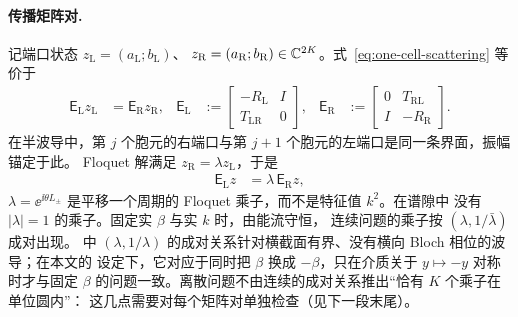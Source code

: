 \paragraph{传播矩阵对.}
记端口状态 $z_{\mathrm L}=(a_{\mathrm L};b_{\mathrm L})$、
$z_{\mathrm R}=(a_{\mathrm R};b_{\mathrm R})\in\mathbb{C}^{2K}$。式~\eqref{eq:one-cell-scattering}
等价于
\begin{align}
  \mathsf E_{\mathrm L}z_{\mathrm L}&=\mathsf E_{\mathrm R}z_{\mathrm R},
  &\mathsf E_{\mathrm L}
  &:=\begin{bmatrix}-R_{\mathrm L}&I\\ T_{\mathrm{LR}}&0\end{bmatrix},
  &\mathsf E_{\mathrm R}
  &:=\begin{bmatrix}0&T_{\mathrm{RL}}\\ I&-R_{\mathrm R}\end{bmatrix}.
  \label{eq:one-cell-pencil}
\end{align}
在半波导中，第 $j$ 个胞元的右端口与第 $j+1$ 个胞元的左端口是同一条界面，振幅锚定于此。
Floquet 解满足 $z_{\mathrm R}=\lambda z_{\mathrm L}$，于是
\begin{align}
  \mathsf E_{\mathrm L}z&=\lambda\,\mathsf E_{\mathrm R}z,
  \label{eq:one-cell-gep}
\end{align}
$\lambda=\ee^{\ii\theta L_\pm}$ 是平移一个周期的 Floquet 乘子，而不是特征值 $k^2$。在谱隙中
没有 $|\lambda|=1$ 的乘子。固定实 $\beta$ 与实 $k$ 时，由能流守恒，
连续问题的乘子按 $(\lambda,1/\bar\lambda)$ 成对出现。\cite[定理~5.1, 6.1]{JolyLiFliss2006}
中 $(\lambda,1/\lambda)$ 的成对关系针对横截面有界、没有横向 Bloch 相位的波导；在本文的
设定下，它对应于同时把 $\beta$ 换成 $-\beta$，只在介质关于 $y\mapsto-y$ 对称时才与固定
$\beta$ 的问题一致。离散问题不由连续的成对关系推出“恰有 $K$ 个乘子在单位圆内”：
这几点需要对每个矩阵对单独检查（见下一段末尾）。

